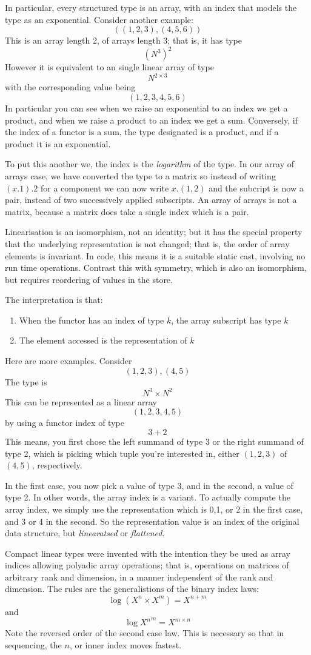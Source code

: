 \documentclass[oneside]{book}
\theoremstyle{plain}
\theoremstyle{definition}
\theoremstyle{plain}
\begin{document}
In particular, every structured type is an array, with an index
that models the type as an exponential. Consider another example:
$$((1,2,3),(4,5,6))$$
This is an array length 2, of arrays length 3; that is, it has type
$$(N^3)^2$$
However it is equivalent to an single linear array
of type
$$N^{2\times 3}$$
with the corresponding value being
$$(1,2,3,4,5,6)$$
In particular you can see when we raise an exponential to an index
we get a product, and when we raise a product to an index we get a sum.
Conversely, if the index of a functor is a sum, the type designated
is a product, and if a product it is an exponential.

To put this another we, the index is the {\em logarithm} of the type.
In our array of arrays case, we have converted the type to a matrix
so instead of writing $(x.1).2$ for a component we can now
write $x.(1,2)$ and the subcript is now a pair, instead of two
successively applied subscripts. An array of arrays is not a matrix,
because a matrix does take a single index which is a pair.

Linearisation is an isomorphism, not an identity; but it has the special
property that the underlying representation is not changed; that is, the order
of array elements is invariant. In code, this means it is a suitable static
cast, involving no run time operations. Contrast this with symmetry, which is 
also an isomorphism, but requires reordering of values in the store.

The interpretation is that:
\begin{enumerate}
\item When the functor has an index of type $k$, the array subscript has type $k$
\item The element accessed is the representation of $k$
\end{enumerate}

Here are more examples. Consider
$$(1,2,3),(4,5)$$
The type is 
$$N^3\times N^2$$
This can be represented as a linear array
$$(1,2,3,4,5)$$
by using a functor index of type
$$3+2$$
This means, you first chose the left summand of type 3 or the right
summand of type 2, which is picking which tuple you're interested in,
either $(1,2,3)$ of $(4,5)$, respectively.

In the first case, you now pick a value of type 3, and in the second,
a value of type 2. In other words, the array index is a variant.
To actually compute the array index, we simply use the representation
which is 0,1, or 2 in the first case, and 3 or 4 in the second.
So the representation value is an index of the original data structure,
but {\em linearatsed} or {\em flattened}.

Compact linear types were invented with the intention they be used
as array indices allowing polyadic array operations; that is,
operations on matrices of arbitrary rank and dimension, in a manner
independent of the rank and dimension. The rules are the generalistions
of the binary index laws:
$$\log (X^n\times X^m) = X ^ {n + m}$$
and
$$\log {X^n}^m = X ^ {m \times n}$$
Note the reversed order of the second case law. This is necessary
so that in sequencing, the $n$, or inner index moves fastest.

\cleardoublepage
{}
\printbibliography
\end{document}
